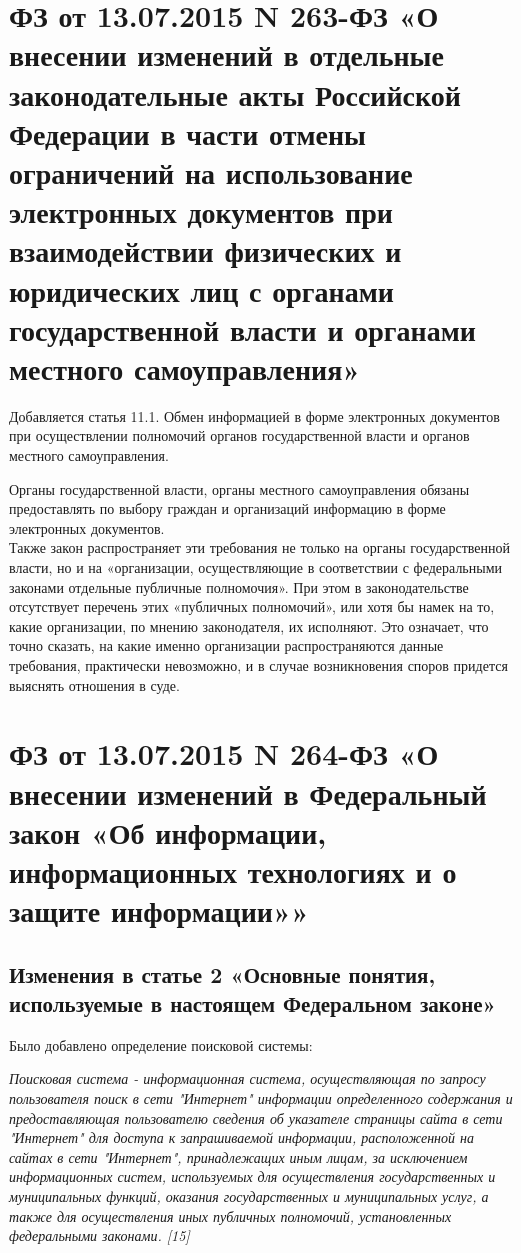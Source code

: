 \documentclass[14pt,a4paper,report]{article}
\begin{document}
\section{ФЗ от 13.07.2015 N 263-ФЗ «О внесении изменений в отдельные законодательные акты Российской Федерации в части отмены ограничений на использование электронных документов при взаимодействии физических и юридических лиц с органами государственной власти и органами местного самоуправления»}

Добавляется статья 11.1. Обмен информацией в форме электронных документов при осуществлении полномочий органов государственной власти и органов местного самоуправления.

Органы государственной власти, органы местного самоуправления обязаны предоставлять по выбору граждан и организаций информацию в форме электронных документов.\\

Также закон распространяет эти требования не только на органы государственной власти, но и на «организации, осуществляющие в соответствии с федеральными законами отдельные публичные полномочия». При этом в законодательстве отсутствует перечень этих «публичных полномочий», или хотя бы намек на то, какие организации, по мнению законодателя, их исполняют. Это означает, что точно сказать, на какие именно организации распространяются данные требования, практически невозможно, и в случае возникновения споров придется выяснять отношения в суде. 


\section{ФЗ от 13.07.2015 N 264-ФЗ «О внесении изменений в Федеральный закон «Об информации, информационных технологиях и о защите информации»»}

\subsection{Изменения в статье 2 «Основные понятия, используемые в настоящем Федеральном законе»}

Было добавлено определение поисковой системы:

\begin{displayquote}
	\emph{Поисковая система - информационная система, осуществляющая по запросу пользователя поиск в сети "Интернет" информации определенного содержания и предоставляющая пользователю сведения об указателе страницы сайта в сети "Интернет" для доступа к запрашиваемой информации, расположенной на сайтах в сети "Интернет", принадлежащих иным лицам, за исключением информационных систем, используемых для осуществления государственных и муниципальных функций, оказания государственных и муниципальных услуг, а также для осуществления иных публичных полномочий, установленных федеральными законами. [15]}
\end{displayquote}
\end{document}
